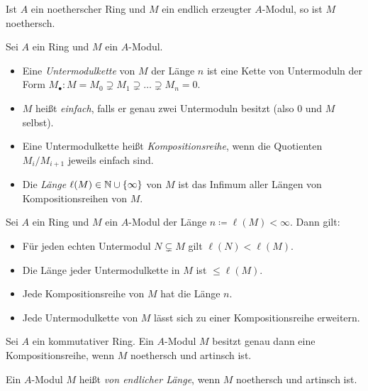 \documentclass{cheat-sheet}
\newcommand{\len}{\ell} %
\begin{document}
\begin{prop}
  Ist $A$ ein noetherscher Ring und $M$ ein endlich erzeugter $A$-Modul, so ist $M$ noethersch.
\end{prop}



\begin{defn}
  Sei $A$ ein Ring und $M$ ein $A$-Modul.
  \begin{itemize}
    \item Eine \emph{Untermodulkette} von $M$ der Länge $n$ ist eine Kette von Untermoduln der Form $M_\bullet : M = M_0 \supsetneq M_1 \supsetneq \ldots \supsetneq M_n = 0$.
    \item $M$ heißt \emph{einfach}, falls er genau zwei Untermoduln besitzt (also $0$ und $M$ selbst).
    \item Eine Untermodulkette heißt \emph{Kompositionsreihe}, wenn die Quotienten $M_i/M_{i+1}$ jeweils einfach sind.
    \item Die \emph{Länge} $\len(M) \in \N \cup \{ \infty \}$ von $M$ ist das Infimum aller Längen von Kompositionsreihen von $M$.
  \end{itemize}
\end{defn}

\begin{prop}
  Sei $A$ ein Ring und $M$ ein $A$-Modul der Länge $n \coloneqq \len(M) < \infty$.
  Dann gilt:
  \begin{itemize}
    \item Für jeden echten Untermodul $N \subsetneq M$ gilt $\len(N) < \len(M)$.
    \item Die Länge jeder Untermodulkette in $M$ ist $\leq \len(M)$.
    \item Jede Kompositionsreihe von $M$ hat die Länge $n$.
    \item Jede Untermodulkette von $M$ lässt sich zu einer Kompositionsreihe erweitern.
  \end{itemize}
\end{prop}


\begin{prop}
  Sei $A$ ein kommutativer Ring.
  Ein $A$-Modul $M$ besitzt genau dann eine Kompositionsreihe, wenn $M$ noethersch und artinsch ist.
\end{prop}

\begin{defn}
  Ein $A$-Modul $M$ heißt \emph{von endlicher Länge}, wenn $M$ noethersch und artinsch ist.
\end{defn}
\end{document}
